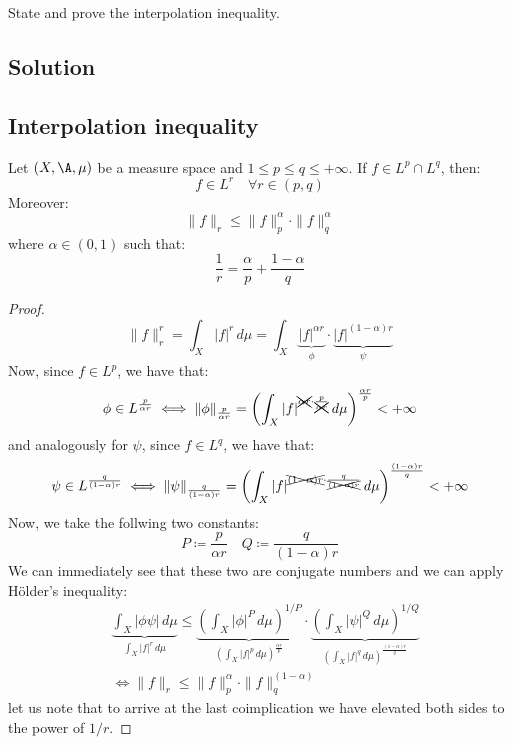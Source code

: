 
\question
State and prove the interpolation inequality.

\subsection*{Solution}

\subsection{Interpolation inequality}
Let $(X,\A,\mu)$ be a measure space and $1\leq p \leq q \leq +\infty$. If $f\in L^p\cap L^q$, then:
\[ f\in L^r \quad \forall r \in (p,q)\]
Moreover:
\[ \|f\|_r \leq \|f\|_p^\alpha \cdot \|f\|_q^\alpha \]
where $\alpha \in (0,1)$ such that:
\[ \frac{1}{r} = \frac{\alpha}{p} + \frac{1-\alpha}{q}\]
\begin{proof}
    \[\|f\|^r_r = \int_X |f|^r \, d\mu = \int_X \underbrace{ |f|^{\alpha r}}_{\phi} \cdot \underbrace{ |f|^{(1-\alpha)r}}_{\psi} \]
    Now, since $f\in L^p$, we have that:
    \[ \phi\in L^{\frac{p}{\alpha r}} \iff \|\phi\|_{\frac{p}{\alpha r}} = \left( \int_X |f|^{\xcancel{\alpha r} \cdot \frac{p}{\xcancel{\alpha r}}} \, d\mu \right)^{\frac{\alpha r}{p}} < +\infty \]
    and analogously for $\psi$, since $f\in L^q$, we have that:
    \[ \psi\in L^{\frac{q}{(1-\alpha)r}} \iff \|\psi\|_{\frac{q}{(1-\alpha)r}} = \left( \int_X |f|^{\xcancel{(1-\alpha)r} \cdot \frac{q}{\xcancel{(1-\alpha)r}}} \, d\mu \right)^{\frac{(1-\alpha)r}{q}} < +\infty \]
    Now, we take the follwing two constants:
    \[ P \coloneqq \frac{p}{\alpha r} \quad Q \coloneqq \frac{q}{(1-\alpha)r}\]
    We can immediately see that these two are conjugate numbers and we can apply Hölder's inequality:
    \begin{align*} %
        & \underbrace{ \int_X |\phi\psi| \, d\mu }_{ \int_X |f|^r \, d\mu } \leq \underbrace{ \left( \int_X |\phi|^P \, d\mu \right)^{1/P} }_{ \left( \int_X |f|^p \, d\mu \right)^{\frac{\alpha r }{p}} } \cdot \underbrace{ \left( \int_X |\psi|^Q \, d\mu \right)^{1/Q} }_{ \left( \int_X |f|^q \, d\mu \right)^{\frac{(1-\alpha)r}{q}} } \\
        & \iff \|f\|_r \leq \|f\|_p^\alpha \cdot \|f\|_q^{(1-\alpha)}
    \end{align*}
    let us note that to arrive at the last coimplication we have elevated both sides to the power of $1/r$.
\end{proof}


